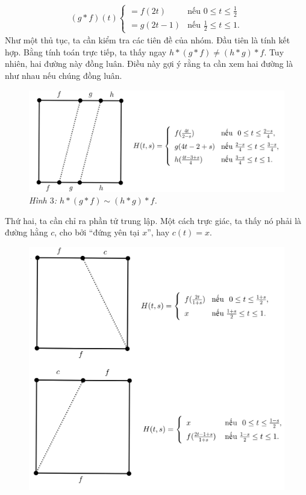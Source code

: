 \begin{multicols}{2}
	\begin{align*}
		(g \ast f)(t) \begin{cases}
			= f(2t) & \text{nếu } 0 \le t \le \frac{1}{2} \\
			= g(2t-1) & \text{nếu } \frac{1}{2} \le t \le 1.
		\end{cases}
	\end{align*}
	Như một thủ tục, ta cần kiểm tra các tiên đề của nhóm. Đầu tiên là tính kết hợp. Bằng tính toán trực tiếp, ta thấy ngay $h \ast (g \ast f) \neq (h \ast g) \ast f$. Tuy nhiên, hai đường này đồng luân. Điều này gợi ý rằng ta cần xem hai đường là như nhau nếu chúng đồng luân.
	\begin{figure}[H]
		\vspace*{5pt}
		\centering
		\captionsetup{labelformat= empty, justification=centering}
		\includegraphics[width= 0.9\linewidth]{h3.png}
		\caption{\small\textit{\color{duongvaotoanhoc}Hình $3$: $h \ast (g \ast f) \sim (h \ast g) \ast f$.}}
		\vspace*{-10pt}
	\end{figure}
	Thứ hai, ta cần chỉ ra phần tử trung lập. Một cách trực giác, ta thấy nó phải là đường hằng $c$, cho bởi ``đứng yên tại $x$'', hay $c(t) = x$.
	\begin{figure}[H]
		\vspace*{-5pt}
		\centering
		\captionsetup{labelformat= empty, justification=centering}
		\includegraphics[width= 0.9\linewidth]{h4.png}

\end{figure}
\end{multicols}
